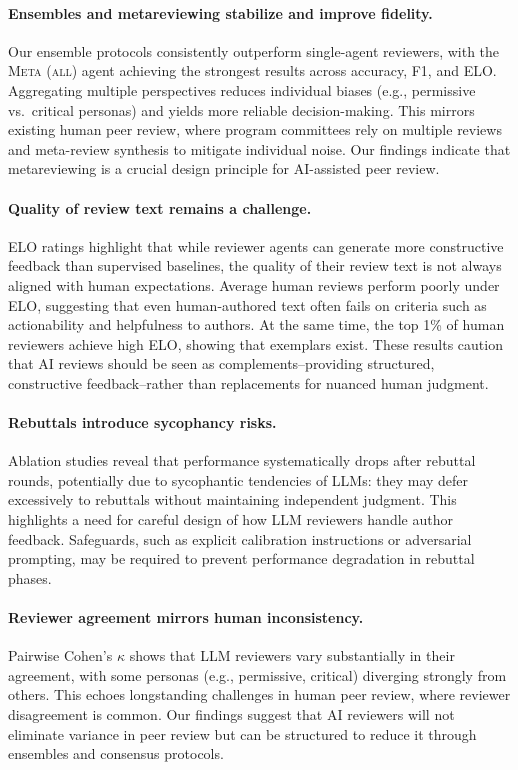 \documentclass{article} %
\newcommand{\shrink}[1][0.5]{\vspace{-#1\baselineskip}}
\begin{document}
\paragraph{Ensembles and metareviewing stabilize and improve fidelity.} \shrink[0.75]
Our ensemble protocols consistently outperform single-agent reviewers, with the \textsc{Meta (all)} agent achieving the strongest results across accuracy, F1, and ELO. Aggregating multiple perspectives reduces individual biases (e.g., permissive vs.\ critical personas) and yields more reliable decision-making. This mirrors existing human peer review, where program committees rely on multiple reviews and meta-review synthesis to mitigate individual noise. Our findings indicate that metareviewing is a crucial design principle for AI-assisted peer review.

\paragraph{Quality of review text remains a challenge.} \shrink[0.75]
ELO ratings highlight that while reviewer agents can generate more constructive feedback than supervised baselines, the quality of their review text is not always aligned with human expectations. Average human reviews perform poorly under ELO, suggesting that even human-authored text often fails on criteria such as actionability and helpfulness to authors. At the same time, the top 1\% of human reviewers achieve high ELO, showing that exemplars exist. These results caution that AI reviews should be seen as complements--providing structured, constructive feedback--rather than replacements for nuanced human judgment.

\paragraph{Rebuttals introduce sycophancy risks.} \shrink[0.75]
Ablation studies reveal that performance systematically drops after rebuttal rounds, potentially due to sycophantic tendencies of LLMs: they may defer excessively to rebuttals without maintaining independent judgment. This highlights a need for careful design of how LLM reviewers handle author feedback. Safeguards, such as explicit calibration instructions or adversarial prompting, may be required to prevent performance degradation in rebuttal phases.

\paragraph{Reviewer agreement mirrors human inconsistency.} \shrink[0.75]
Pairwise Cohen’s $\kappa$ shows that LLM reviewers vary substantially in their agreement, with some personas (e.g., permissive, critical) diverging strongly from others. This echoes longstanding challenges in human peer review, where reviewer disagreement is common. Our findings suggest that AI reviewers will not eliminate variance in peer review but can be structured to reduce it through ensembles and consensus protocols.
\end{document}
